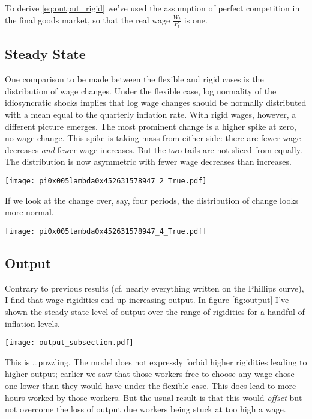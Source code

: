 \documentclass[12pt,a4paper]{scrartcl}            %
\begin{document}
To derive \eqref{eq:output_rigid} we've used the assumption of perfect competition in the final goods market, so that the real wage $\frac{W_t}{P_t}$ is one.

\subsection{Steady State}
\label{sub:steady_state}

One comparison to be made between the flexible and rigid cases is the distribution of wage changes.
Under the flexible case, log normality of the idiosyncratic shocks implies that log wage changes should be normally distributed with a mean equal to the quarterly inflation rate.
With rigid wages, however, a different picture emerges.
The most prominent change is a higher spike at zero, no wage change.
This spike is taking mass from either side: there are fewer wage decreases \emph{and} fewer wage increases.
But the two tails are not sliced from equally.
The distribution is now asymmetric with fewer wage decreases than increases.

\begin{center}
  \texttt{[image: pi0x005lambda0x452631578947\_2\_True.pdf]}
  \label{fig:dist_2_periods}
\end{center}

If we look at the change over, say, four periods, the distribution of change looks more normal.

\begin{center}
  \texttt{[image: pi0x005lambda0x452631578947\_4\_True.pdf]}
  \label{fig:dist_4_periods}
\end{center}


\subsection{Output}

Contrary to previous results (cf. nearly everything written on the Phillips curve), I find that wage rigidities end up increasing output.
In figure \ref{fig:output} I've shown the steady-state level of output over the range of rigidities for a handful of inflation levels.

\begin{center}
  \texttt{[image: output\_subsection.pdf]}
  \label{fig:output}
\end{center}

This is \ldots puzzling.
The model does not expressly forbid higher rigidities leading to higher output;
earlier we saw that those workers free to choose any wage chose one lower than they would have under the flexible case.
This does lead to more hours worked by those workers.
But the usual result is that this would \emph{offset} but not overcome the loss of output due workers being stuck at too high a wage.
\end{document}

